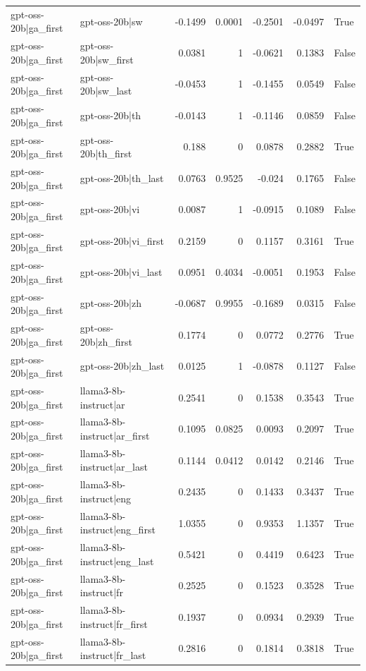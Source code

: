 \begin{table}
\begin{tabular}{l l r r r r l}
gpt-oss-20b|ga_first & gpt-oss-20b|sw & -0.1499 & 0.0001 & -0.2501 & -0.0497 & True \\
gpt-oss-20b|ga_first & gpt-oss-20b|sw_first & 0.0381 & 1 & -0.0621 & 0.1383 & False \\
gpt-oss-20b|ga_first & gpt-oss-20b|sw_last & -0.0453 & 1 & -0.1455 & 0.0549 & False \\
gpt-oss-20b|ga_first & gpt-oss-20b|th & -0.0143 & 1 & -0.1146 & 0.0859 & False \\
gpt-oss-20b|ga_first & gpt-oss-20b|th_first & 0.188 & 0 & 0.0878 & 0.2882 & True \\
gpt-oss-20b|ga_first & gpt-oss-20b|th_last & 0.0763 & 0.9525 & -0.024 & 0.1765 & False \\
gpt-oss-20b|ga_first & gpt-oss-20b|vi & 0.0087 & 1 & -0.0915 & 0.1089 & False \\
gpt-oss-20b|ga_first & gpt-oss-20b|vi_first & 0.2159 & 0 & 0.1157 & 0.3161 & True \\
gpt-oss-20b|ga_first & gpt-oss-20b|vi_last & 0.0951 & 0.4034 & -0.0051 & 0.1953 & False \\
gpt-oss-20b|ga_first & gpt-oss-20b|zh & -0.0687 & 0.9955 & -0.1689 & 0.0315 & False \\
gpt-oss-20b|ga_first & gpt-oss-20b|zh_first & 0.1774 & 0 & 0.0772 & 0.2776 & True \\
gpt-oss-20b|ga_first & gpt-oss-20b|zh_last & 0.0125 & 1 & -0.0878 & 0.1127 & False \\
gpt-oss-20b|ga_first & llama3-8b-instruct|ar & 0.2541 & 0 & 0.1538 & 0.3543 & True \\
gpt-oss-20b|ga_first & llama3-8b-instruct|ar_first & 0.1095 & 0.0825 & 0.0093 & 0.2097 & True \\
gpt-oss-20b|ga_first & llama3-8b-instruct|ar_last & 0.1144 & 0.0412 & 0.0142 & 0.2146 & True \\
gpt-oss-20b|ga_first & llama3-8b-instruct|eng & 0.2435 & 0 & 0.1433 & 0.3437 & True \\
gpt-oss-20b|ga_first & llama3-8b-instruct|eng_first & 1.0355 & 0 & 0.9353 & 1.1357 & True \\
gpt-oss-20b|ga_first & llama3-8b-instruct|eng_last & 0.5421 & 0 & 0.4419 & 0.6423 & True \\
gpt-oss-20b|ga_first & llama3-8b-instruct|fr & 0.2525 & 0 & 0.1523 & 0.3528 & True \\
gpt-oss-20b|ga_first & llama3-8b-instruct|fr_first & 0.1937 & 0 & 0.0934 & 0.2939 & True \\
gpt-oss-20b|ga_first & llama3-8b-instruct|fr_last & 0.2816 & 0 & 0.1814 & 0.3818 & True \\

\end{tabular}
\end{table}
